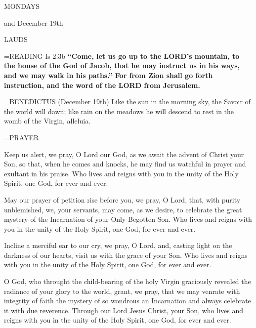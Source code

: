 \begin{center}
\normalsize \begin{center}\normalsize MONDAYS\\
\end{center}
\footnotesize and December 19th\\
\end{center}

\begin{flushleft}\normalsize LAUDS\\\end{flushleft}

\hangindent=\parindent \small{READING} Is 2:3b \textbf{“Come, let us go up to the LORD’s mountain, to the house of the God of Jacob, that he may instruct us in his ways, and we may walk in his paths.” For from Zion shall go forth instruction, and the word of the LORD from Jerusalem.\\}

\hangindent=\parindent \small{BENEDICTUS  (December 19th) Like the sun in the morning sky, the Savoir of the world will dawn; like rain on the meadows he will descend to rest in the womb of the Virgin, alleluia.\\}

\hangindent=\parindent \small PRAYER
\begin{description}[labelindent=\parindent, noitemsep, leftmargin=*]
\item [Week 1:]  Keep us alert, we pray, O Lord our God, as we await the advent of Christ your Son, so that, when he comes and knocks, he may find us watchful in prayer and exultant in his praise. Who lives and reigns with you in the unity of the Holy Spirit, one God, for ever and ever.
\item [Week 2:]  May our prayer of petition rise before you, we pray, O Lord, that, with purity unblemished, we, your servants, may come, as we desire, to celebrate the great mystery of the Incarnation of your Only Begotten Son. Who lives and reigns with you in the unity of the Holy Spirit, one God, for ever and ever.
\item [Week 3:]  Incline a merciful ear to our cry, we pray, O Lord, and, casting light on the darkness of our hearts, visit us with the grace of your Son. Who lives and reigns with you in the unity of the Holy Spirit, one God, for ever and ever.
\item [December 19th:]  O God, who throught the child-bearing of the holy Virgin graciously revealed the radiance of your glory to the world, grant, we pray, that we may venrate with integrity of faith the mystery of so wondrous an Incarnation and always celebrate it with due reverence. Through our Lord Jesus Christ, your Son, who lives and reigns with you in the unity of the Holy Spirit, one God, for ever and ever.
\end{description}

